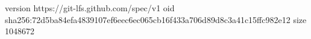 version https://git-lfs.github.com/spec/v1
oid sha256:72d5ba84efa4839107ef6eec6ec065cb16f433a706d89d8c3a41c15ffc982e12
size 1048672
